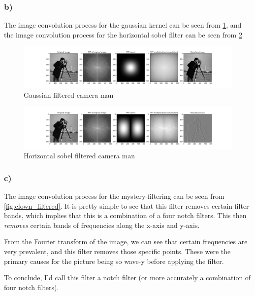 \subsubsection*{b)}
The image convolution process for the gaussian kernel can be seen from \cref{fig:camera_gaussian}, and the image convolution process for the horizontal sobel filter can be seen from \cref{fig:camera_sobelx}

\begin{figure}[]
    \centering
    \includegraphics[width=1.00\textwidth]{figures/image_processed/camera_gaussian_subplots.png}
    \caption{Gaussian filtered camera man}
    \label{fig:camera_gaussian}
\end{figure}

\begin{figure}[]
    \centering
    \includegraphics[width=1.00\textwidth]{figures/image_processed/camera_sobelx_subplots.png}
    \caption{Horizontal sobel filtered camera man}
    \label{fig:camera_sobelx}
\end{figure}

\subsubsection*{c)}
The image convolution process for the mystery-filtering can be seen from \cref{fig:clown_filtered}. It is pretty simple to see that this filter removes certain filter-bands, which implies that this is a combination of a four notch filters. This then \textit{removes} certain bands of frequencies along the x-axis and y-axis. 

From the Fourier transform of the image, we can see that certain frequencies are very prevalent, and this filter removes those specific points. These were the primary causes for the picture being so wave-y before applying the filter. 

To conclude, I'd call this filter a notch filter (or more accurately a combination of four notch filters). 

